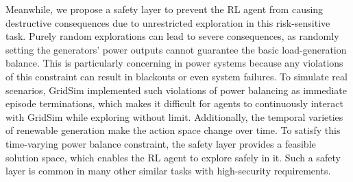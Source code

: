 Meanwhile, we propose a safety layer to prevent the RL agent from causing destructive consequences due to unrestricted exploration in this risk-sensitive task.
Purely random explorations can lead to severe consequences, as randomly setting the generators' power outputs cannot guarantee the basic load-generation balance.  
This is particularly concerning in power systems because any violations of this constraint can result in blackouts or even system failures\cite{enwiki:1103904998,bialek2020does}.
To simulate real scenarios, GridSim implemented such violations of power balancing as immediate episode terminations, which makes it difficult for agents to continuously interact with GridSim while exploring without limit.
Additionally, the temporal varieties of renewable generation make the action space change over time. 
To satisfy this time-varying power balance constraint, the safety layer provides a feasible solution space, which enables the RL agent to explore safely in it. 
Such a safety layer is common in many other similar tasks with high-security requirements\cite{shao2022safety,chitta2022transfuser}.
